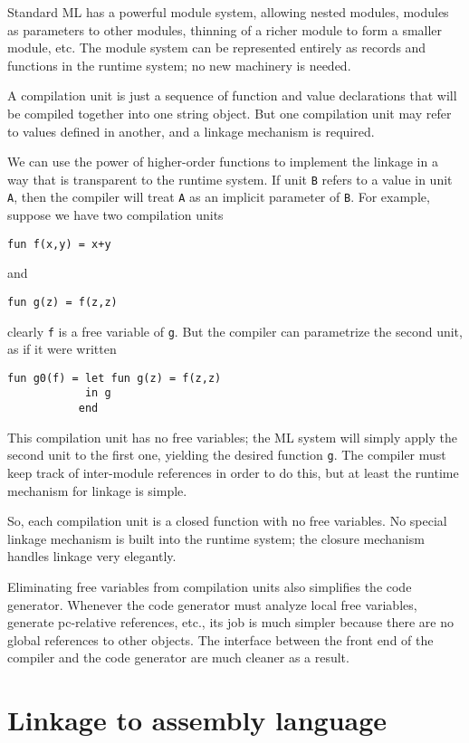 Standard ML has a powerful module
system, allowing nested modules,
modules as parameters to other modules, thinning of a richer module
to form a smaller module, etc.  The module system can be represented
entirely as records and functions in the runtime system\cite{appel87:sml};
no new machinery is needed.

A compilation unit
is just a sequence of function and value declarations that
will be compiled together into one string object.  But one compilation
unit may refer to values defined in another, and a linkage
mechanism is required.

We can use the power of higher-order functions to implement the linkage
in a way that is transparent to the runtime system.  If unit \verb"B"
refers to a value in unit \verb"A", then the compiler will treat
\verb"A" as an implicit parameter of \verb"B".  For example, suppose we have
two compilation units
\begin{verbatim}
fun f(x,y) = x+y
\end{verbatim}
and
\begin{verbatim}
fun g(z) = f(z,z)
\end{verbatim}
clearly \verb"f" is a free variable
of \verb"g".  But the compiler can
parametrize the second unit, as if it were written
\begin{verbatim}
fun g0(f) = let fun g(z) = f(z,z)
            in g
           end
\end{verbatim}
This compilation unit has no free variables; the ML system will simply
apply the second unit to the first one, yielding the desired function
\verb"g".  The compiler must keep track of inter-module references
in order to do this, but at least the runtime mechanism for linkage is simple.

So, each compilation unit is a closed function with no free variables.
No special linkage mechanism is built into the runtime system; the
closure
mechanism handles linkage very elegantly.

Eliminating free variables from compilation units also simplifies the
code generator.
Whenever the code generator must analyze local free variables,
generate pc-relative references, etc.,
its job is much simpler because there
are no global references to other objects.  The interface between the
front end of the compiler and the code generator are much cleaner as a result.

\section{Linkage to assembly language}
\label{linkage}

